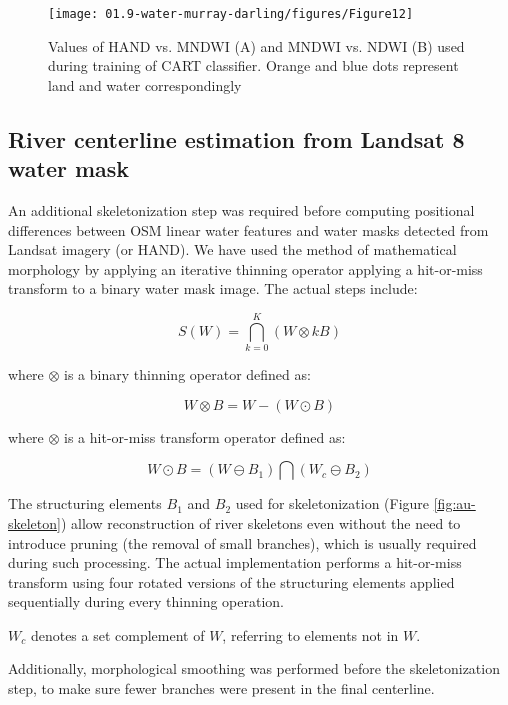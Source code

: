 \begin{figure}[H]
	\centering
	\texttt{[image: 01.9-water-murray-darling/figures/Figure12]}
	\caption{Values of \gls{HAND} vs. \gls{MNDWI} (A) and \gls{MNDWI} vs. \gls{NDWI} (B) used during training of CART classifier. Orange and blue dots represent land and water correspondingly}
	\label{fig:au-hand-vs-mndwi}
\end{figure}

\subsection{River centerline estimation from Landsat 8 water mask}
An additional skeletonization step was required before computing positional differences between OSM linear water features and water masks detected from Landsat imagery (or \gls{HAND}). We have used the method of mathematical morphology \citet{Serra1982} by applying an iterative thinning operator applying a hit-or-miss transform to a binary water mask image. The actual steps include:

\begin{equation}
S(W)=\bigcap_{k=0}^K \left(W \otimes kB \right)
\end{equation}

where $\otimes$ is a binary thinning operator defined as:

\begin{equation}
W \otimes B = W - \left( W \odot B \right)
\end{equation}

where $\otimes$ is a hit-or-miss transform operator defined as:

\begin{equation}
W \odot B = \left( W \ominus B_1 \right) \bigcap \left( W_c \ominus B_2 \right)
\end{equation}

The structuring elements $B_1$ and $B_2$ used for skeletonization (Figure \ref{fig:au-skeleton}) allow reconstruction of river skeletons even without the need to introduce pruning (the removal of small branches), which is usually required during such processing. The actual implementation performs a hit-or-miss transform using four rotated versions of the structuring elements applied sequentially during every thinning operation.

$W_c$ denotes a set complement of $W$, referring to elements not in $W$. 

Additionally, morphological smoothing was performed before the skeletonization step, to make sure fewer branches were present in the final centerline.

